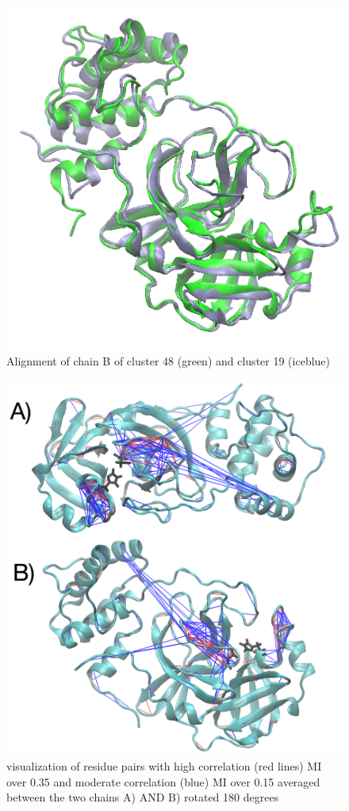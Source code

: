 \documentclass{biophys-new}
\begin{document}
\begin{figure}  %
\centering
\includegraphics[width=0.6\linewidth]{supplemental_figures/green48_iceblue19_smaller.png}
\caption{Alignment of chain B of cluster 48 (green) and cluster 19 (iceblue)}
\label{fig:view}
\end{figure}

\begin{figure}[hbt!]
\centering
\includegraphics[width=0.6\linewidth]{supplemental_figures/Averaged_MI_image_smaller.png}
\caption{visualization of residue pairs with high correlation (red lines) MI over 0.35 and moderate correlation (blue) MI over 0.15 averaged between the two chains A) AND B) rotated 180 degrees}
\label{fig:view}
\end{figure}
\end{document}
